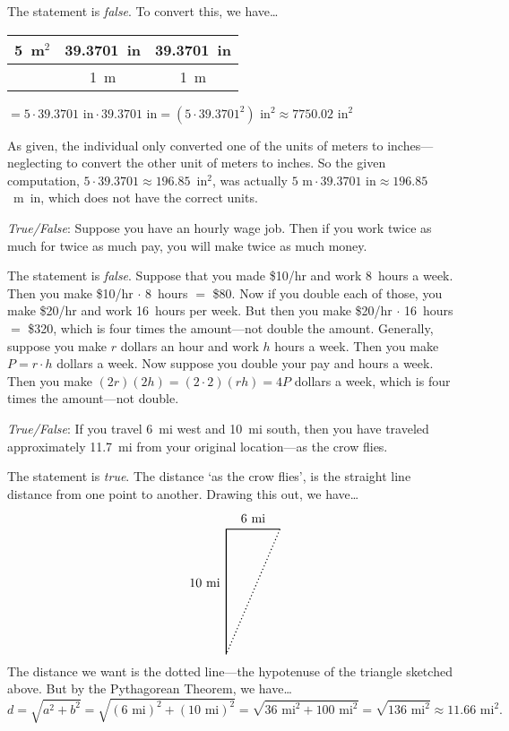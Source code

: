 \documentclass[11pt,letterpaper]{article}
\begin{document}
\sol The statement is \textit{false}. To convert this, we have\dots \par
	\begin{table}[!ht]
	\centering
	\begin{tabular}{c|c|c}
	5~m$^2$ & 39.3701~in & 39.3701~in \\ \hline
		     & 1~m 		  & 1~m 
	\end{tabular}
	$= 5 \cdot 39.3701 \text{ in} \cdot 39.3701 \text{ in}= (5 \cdot 39.3701^2) \text{ in}^2 \approx 7750.02 \text{ in}^2$
	\end{table}
As given, the individual only converted one of the units of meters to inches---neglecting to convert the other unit of meters to inches. So the given computation, $5 \cdot 39.3701 \approx 196.85$~in$^2$, was actually $5 \text{ m} \cdot 39.3701 \text{ in} \approx 196.85$~m~in, which does not have the correct units. \vfill



\quizsol \textit{True/False}: Suppose you have an hourly wage job. Then if you work twice as much for twice as much pay, you will make twice as much money. \pspace

\sol The statement is \textit{false}. Suppose that you made \$10/hr and work 8~hours a week. Then you make \$10/hr $\cdot$ 8~hours $=$ \$80. Now if you double each of those, you make \$20/hr and work 16~hours per week. But then you make \$20/hr $\cdot$ 16~hours $=$ \$320, which is four times the amount---not double the amount. Generally, suppose you make $r$ dollars an hour and work $h$ hours a week. Then you make $P= r \cdot h$ dollars a week. Now suppose you double your pay and hours a week. Then you make $(2r)(2h)= (2 \cdot 2)(rh)= 4P$ dollars a week, which is four times the amount---not double. \vfill





\newpage





\quizsol \textit{True/False}: If you travel 6~mi west and 10~mi south, then you have traveled approximately 11.7~mi from your original location---as the crow flies. \pspace

\sol The statement is \textit{true}. The distance `as the crow flies', is the straight line distance from one point to another. Drawing this out, we have\dots
	\[
	\begin{tikzpicture}
	\draw[line width= 0.03cm,black] (0,0) -- (-1.5,0) -- (-1.5,-3.5);
	\node at (-0.75,0.3) {$6$~mi};
	\node at (-2.1,-1.5) {$10$~mi};
	\draw[line width= 0.03cm,black,dotted] (0,0) -- (-1.5,-3.5);
	\end{tikzpicture}
	\] 
The distance we want is the dotted line---the hypotenuse of the triangle sketched above. But by the Pythagorean Theorem, we have\dots
	\[
	d= \sqrt{a^2 + b^2}= \sqrt{(6 \text{ mi})^2 + (10 \text{ mi})^2}= \sqrt{36 \text{ mi}^2 + 100 \text{ mi}^2}= \sqrt{136 \text{ mi}^2} \approx 11.66 \text{ mi}^2.
	\] \pvspace{1.5cm}
\end{document}
